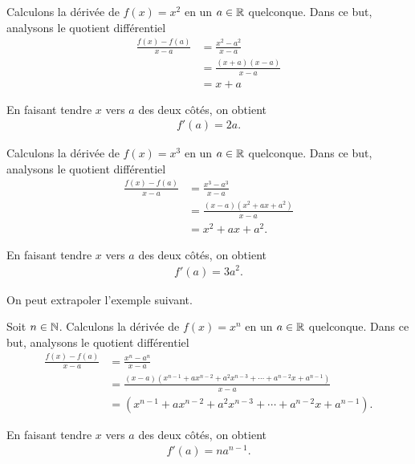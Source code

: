 \documentclass[main.tex]{subfiles}
\begin{document}
\begin{example}
    [Dérivée de $x^2$]

    Calculons la dérivée de $f(x) = x^2$ en un $a \in \mathbb{R}$ quelconque.
    Dans ce but,
    analysons le quotient différentiel
    \begin{align}
        \frac {f(x) - f(a)}{x - a}
        &= \frac {x^2 - a^2}{x - a}\\
        &= \frac {(x + a)(x - a)}{x - a}\\
        &= x + a
    \end{align}

    En faisant tendre $x$ vers $a$ des deux côtés,
    on obtient
    \begin{align}
        f'(a) = 2a.
    \end{align}
\end{example}

\begin{example}
    [Dérivée de $x^3$]

    Calculons la dérivée de $f(x) = x^3$ en un $a \in \mathbb{R}$ quelconque.
    Dans ce but,
    analysons le quotient différentiel
    \begin{align}
        \frac {f(x) - f(a)}{x - a}
        &= \frac {x^3 - a^3}{x - a}\\
        &= \frac {(x-a)(x^2 + ax + a^2)}{x - a}\\
        &= x^2 + ax + a^2.
    \end{align}

    En faisant tendre $x$ vers $a$ des deux côtés,
    on obtient
    \begin{align}
        f'(a) = 3a^2.
    \end{align}
\end{example}

On peut extrapoler l'exemple suivant.

\begin{example}
    [Dérivée de $x^n$]

    Soit $n \in \mathbb{N}$.
    Calculons la dérivée de $f(x) = x^n$ en un $a \in \mathbb{R}$ quelconque.
    Dans ce but,
    analysons le quotient différentiel
    \begin{align}
        \frac {f(x) - f(a)}{x - a}
        &= \frac {x^n - a^n}{x - a}\\
        &= \frac {(x-a)(x^{n-1} + ax^{n-2} + a^2x^{n-3} + \cdots + a^{n-2}x + a^{n-1})}{x - a}\\
        &= (x^{n-1} + ax^{n-2} + a^2x^{n-3} + \cdots + a^{n-2}x + a^{n-1}).
    \end{align}

    En faisant tendre $x$ vers $a$ des deux côtés,
    on obtient
    \begin{align}
        f'(a) = na^{n-1}.
    \end{align}
\end{example}
\end{document}
